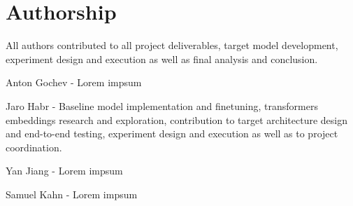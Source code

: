 \section*{Authorship}

All authors contributed to all project deliverables, target model development, experiment design and execution as well as final analysis and conclusion.

Anton Gochev - Lorem impsum

Jaro Habr - Baseline model implementation and finetuning, transformers embeddings research and exploration, contribution to target architecture design and end-to-end testing, experiment design and execution as well as to project coordination.

Yan Jiang - Lorem impsum

Samuel Kahn - Lorem impsum
